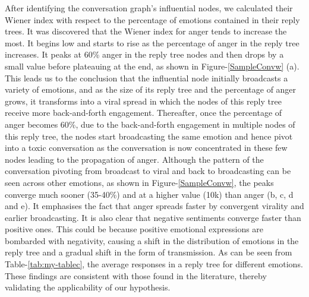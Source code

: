 \documentclass[acmtog]{acmart}
\begin{document}
After identifying the conversation graph's influential nodes, we calculated their Wiener index with respect to the percentage of emotions contained in their reply trees. It was discovered that the Wiener index for anger tends to increase the most. It begins low and starts to rise as the percentage of anger in the reply tree increases. It peaks at 60\% anger in the reply tree nodes and then drops by a small value before plateauing at the end, as shown in Figure-\ref{SampleConvw} (a). This leads us to the conclusion that the influential node initially broadcasts a variety of emotions, and as the size of its reply tree and the percentage of anger grows, it transforms into a viral spread in which the nodes of this reply tree receive more back-and-forth engagement. Thereafter, once the percentage of anger becomes 60\%, due to the back-and-forth engagement in multiple nodes of this reply tree, the nodes start broadcasting the same emotion and hence pivot into a toxic conversation as the conversation is now concentrated in these few nodes leading to the propagation of anger. Although the pattern of the conversation pivoting from broadcast to viral and back to broadcasting can be seen across other emotions, as shown in Figure-\ref{SampleConvw}, the peaks converge much sooner (35-40\%) and at a higher value (10k) than anger (b, c, d and e). It emphasises the fact that anger spreads faster by convergent virality and earlier broadcasting. It is also clear that negative sentiments converge faster than positive ones. This could be because positive emotional expressions are bombarded with negativity, causing a shift in the distribution of emotions in the reply tree and a gradual shift in the form of transmission. As can be seen from Table-\ref{tab:my-tablec}, the average responses in a reply tree for different emotions. These findings are consistent with those found in the literature, thereby validating the applicability of our hypothesis.
\end{document}
